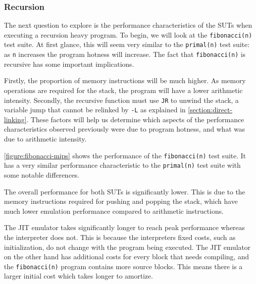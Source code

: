\subsubsection{Recursion}
\label{section:perf-recursion}

The next question to explore is the performance characteristics of the SUTs when executing a recursion heavy program. To begin, we will look at the \texttt{fibonacci(n)} test suite. At first glance, this will seem very similar to the \texttt{primal(n)} test suite: as \texttt{n} increases the program hotness will increase. The fact that \texttt{fibonacci(n)} is recursive has some important implications.

Firstly, the proportion of memory instructions will be much higher. As memory operations are required for the stack, the program will have a lower arithmetic intensity. Secondly, the recursive function must use \texttt{JR} to unwind the stack, a variable jump that cannot be relinked by \texttt{-L} as explained in \autoref{section:direct-linking}. These factors will help us determine which aspects of the performance characteristics observed previously were due to program hotness, and what was due to arithmetic intensity.


\autoref{figure:fibonacci-mips} shows the performance of the \texttt{fibonacci(n)} test suite. It has a very similar performance characteristic to the \texttt{primal(n)} test suite with some notable differences.

The overall performance for both SUTs is significantly lower. This is due to the memory instructions required for pushing and popping the stack, which have much lower emulation performance compared to arithmetic instructions.

The JIT emulator takes significantly longer to reach peak performance whereas the interpreter does not. This is because the interpreters fixed costs, such as initialization, do not change with the program being executed. The JIT emulator on the other hand has additional costs for every block that needs compiling, and the \texttt{fibonacci(n)} program contains more source blocks. This means there is a larger initial cost which takes longer to amortize.

